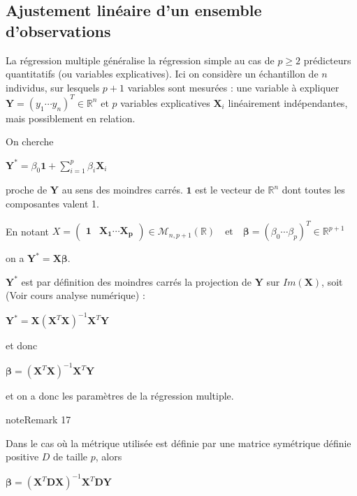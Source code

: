 \documentclass[letterpaper,10pt,english]{jupyterBook}
\begin{document}
\subsection{Ajustement linéaire d’un ensemble d’observations}
\label{\detokenize{regression:ajustement-lineaire-d-un-ensemble-d-observations}}\label{\detokenize{regression:index-2}}
\sphinxAtStartPar
La régression multiple généralise la régression simple au cas de \(p\geq 2\) prédicteurs quantitatifs (ou variables explicatives). Ici on considère un échantillon de \(n\) individus, sur lesquels \(p+1\) variables sont mesurées : une variable à expliquer \(\mathbf Y = (y_1\cdots y_n)^T\in\mathbb{R}^n\) et \(p\) variables explicatives \(\mathbf X_i\) linéairement indépendantes, mais possiblement en relation.

\sphinxAtStartPar
On cherche

\sphinxAtStartPar
\(\mathbf Y^* = \beta_0 \mathbf{1} + \displaystyle\sum_{i=1}^p \beta_i\mathbf X_i\)

\sphinxAtStartPar
proche de \(\mathbf Y\) au sens des moindres carrés. \(\mathbf{1}\) est le vecteur de \(\mathbb{R}^n\) dont toutes les composantes valent 1.

\sphinxAtStartPar
En notant
\(X = \begin{pmatrix}\mathbf{1} & \mathbf{X_1}\cdots \mathbf{X_p}\end{pmatrix}\in\mathcal{M}_{n,p+1}(\mathbb{R})\quad\text{et}\quad \boldsymbol{\beta}=(\beta_0\cdots \beta_p)^T
\in\mathbb{R}^{p+1}\)

\sphinxAtStartPar
on a \(\mathbf Y^*=\mathbf X\boldsymbol \beta\).

\sphinxAtStartPar
\(\mathbf Y^*\) est par définition des moindres carrés la projection de \(\mathbf Y\) sur \(Im(\mathbf X)\), soit (Voir cours analyse numérique) :

\sphinxAtStartPar
\(\mathbf Y^* = \mathbf X(\mathbf X^T\mathbf X)^{-1}\mathbf X^T \mathbf Y\)

\sphinxAtStartPar
et donc

\sphinxAtStartPar
\(\boldsymbol\beta = (\mathbf X^T\mathbf X)^{-1}\mathbf X^T \mathbf Y\)

\sphinxAtStartPar
et on a donc les paramètres de la régression multiple.
\label{regression:remark-4}
\begin{sphinxadmonition}{note}{Remark 17}



\sphinxAtStartPar
Dans le cas où la métrique utilisée est définie par une matrice symétrique définie positive \(D\) de taille \(p\), alors

\sphinxAtStartPar
\(\boldsymbol\beta = (\mathbf X^T\mathbf D \mathbf X)^{-1}\mathbf X^T \mathbf D \mathbf Y\)
\end{sphinxadmonition}
\end{document}
